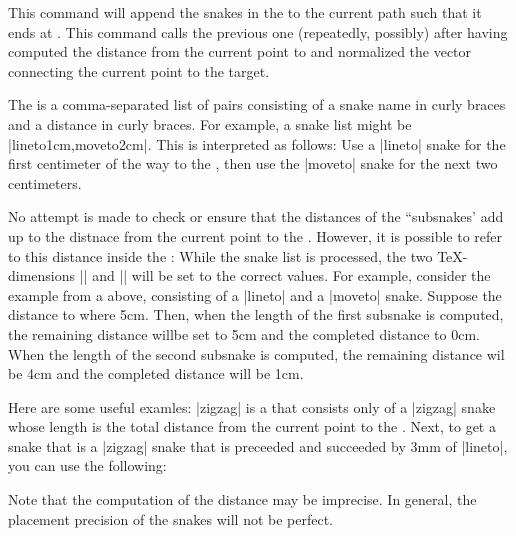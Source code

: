 \begin{command}{\pgfpathsnakesto{}}
  This command will append the snakes in the   to the
  current path such that it ends at . This command calls the previous 
  one (repeatedly, possibly) after having computed the distance from
  the current point to  and normalized the vector
  connecting the current point to the target.

  The  is a comma-separated list of pairs consisting
  of a snake name in curly braces and a distance in curly braces. For
  example, a snake list might be |{lineto}{1cm},{moveto}{2cm}|. This
  is interpreted as follows: Use a |lineto| snake for the first
  centimeter of the way to the , then use the |moveto|
  snake for the next two centimeters.

  No attempt is made to check or ensure that the distances of the
  ``subsnakes' add up to the distnace from the current point to the
  . However, it is possible to refer to this distance
  inside the : While the snake list is processed, the
  two \TeX-dimensions |\pgfsnakeremainingdistance| and
  |\pgfsnakecompleteddistance| will be set to the correct values. For
  example, consider the example from a above, consisting of a |lineto|
  and a |moveto| snake. Suppose the distance to  where
  5cm. Then, when the length of the first subsnake is computed, the
  remaining distance willbe set to 5cm and the completed distance to
  0cm. When the length of the second subsnake is computed, the
  remaining distance wil be 4cm and the completed distance will be
  1cm.

  Here are some useful examles: |{zigzag}{\pgfsnakeremainingdistance}|
  is a  that consists only of a |zigzag| snake whose
  length is the total distance from the current point to the
  . Next, to get a snake that is a |zigzag| snake that is
  preceeded and succeeded by 3mm of |lineto|, you can use the
  following:
\begin{codeexample}[]
\end{codeexample}

  Note that the computation of the distance may be imprecise. In
  general, the placement precision of the snakes will not be perfect. 
\end{command}

